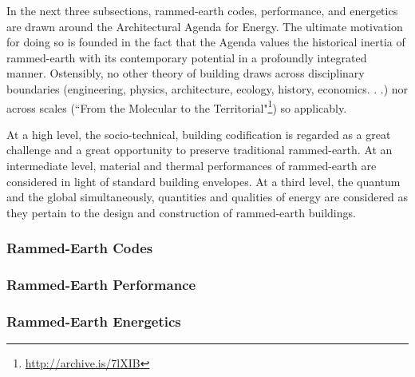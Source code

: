 In the next three subsections, rammed-earth codes, performance, and energetics are drawn around the Architectural Agenda for Energy. The ultimate motivation for doing so is founded in the fact that the Agenda values the historical inertia of rammed-earth with its contemporary potential in a profoundly integrated manner. Ostensibly, no other theory of building draws across disciplinary boundaries (engineering, physics, architecture, ecology, history, economics. . .) nor across scales (``From the Molecular to the Territorial"\footnote{\url{http://archive.is/7lXIB}}) so applicably.

At a high level, the socio-technical, building codification is regarded as a great challenge and a great opportunity to preserve traditional rammed-earth. At an intermediate level, material and thermal performances of rammed-earth are considered in light of standard building envelopes. At a third level, the quantum and the global simultaneously, quantities and qualities of energy are considered as they pertain to the design and construction of rammed-earth buildings.



\subsubsection{Rammed-Earth Codes}



\subsubsection{Rammed-Earth Performance}



\subsubsection{Rammed-Earth Energetics}
